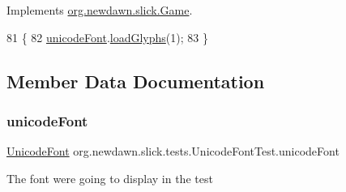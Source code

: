 Implements \mbox{\hyperlink{interfaceorg_1_1newdawn_1_1slick_1_1_game_ab07b2e9463ee4631620dde0de25bdee8}{org.\+newdawn.\+slick.\+Game}}.


\begin{DoxyCode}
81                                                                                   \{
82         \mbox{\hyperlink{classorg_1_1newdawn_1_1slick_1_1tests_1_1_unicode_font_test_a665bec7950c1a7d41d3cf6c81cbdb880}{unicodeFont}}.\mbox{\hyperlink{classorg_1_1newdawn_1_1slick_1_1_unicode_font_abf14d8ad33f80b66e14990417bd04088}{loadGlyphs}}(1);
83     \}
\end{DoxyCode}


\subsection{Member Data Documentation}
\mbox{\label{classorg_1_1newdawn_1_1slick_1_1tests_1_1_unicode_font_test_a665bec7950c1a7d41d3cf6c81cbdb880}} 
\subsubsection{\texorpdfstring{unicode\+Font}{unicodeFont}}
{\footnotesize\ttfamily \mbox{\hyperlink{classorg_1_1newdawn_1_1slick_1_1_unicode_font}{Unicode\+Font}} org.\+newdawn.\+slick.\+tests.\+Unicode\+Font\+Test.\+unicode\+Font\hspace{0.3cm}{\ttfamily [private]}}

The font we\textquotesingle{}re going to display in the test 